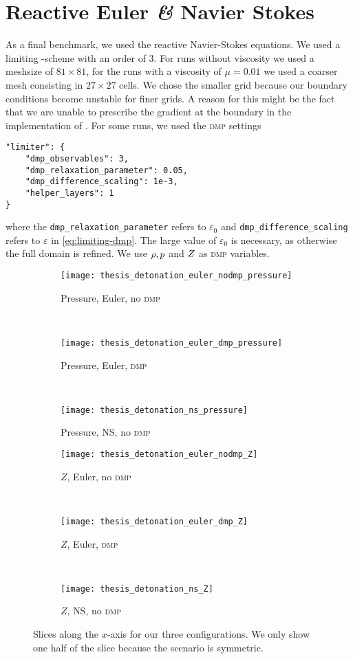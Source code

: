 \section{Reactive Euler \textit{\&} Navier Stokes}
As a final benchmark, we used the reactive Navier-Stokes equations.
We used a limiting \aderdg{}-scheme with an order of 3.
For runs without viscosity we used a meshsize of $81 \times 81$, for the runs with a viscosity of $\mu = 0.01$ we used a coarser mesh consisting in $27 \times 27$ cells.
We chose the smaller grid because our boundary conditions become unstable for finer grids.
A reason for this might be the fact that we are unable to prescribe the gradient at the boundary in the \muscl{} implementation of \exahype{}.
For some runs, we used the \textsc{dmp} settings
\begin{verbatim}
"limiter": {
    "dmp_observables": 3,
    "dmp_relaxation_parameter": 0.05,
    "dmp_difference_scaling": 1e-3,
    "helper_layers": 1
}
\end{verbatim}
where the \texttt{dmp\_relaxation\_parameter} refers to $\varepsilon_0$ and \texttt{dmp\_difference\_scaling} refers to $\varepsilon$ in \cref{eq:limiting-dmp}.
The large value of $\varepsilon_0$ is necessary, as otherwise the full domain is refined.
We use $\rho, p$ and $Z$ as \textsc{dmp} variables.
\begin{figure}[tb]
  \centering
  \begin{subfigure}[t]{0.3\textwidth}
    \centering
    \texttt{[image: thesis\_detonation\_euler\_nodmp\_pressure]}
    \caption{Pressure, Euler, no \textsc{dmp}}
  \end{subfigure}~%
  \begin{subfigure}[t]{0.3\textwidth}
    \centering
    \texttt{[image: thesis\_detonation\_euler\_dmp\_pressure]}
    \caption{Pressure, Euler, \textsc{dmp}}
  \end{subfigure}~%
  \begin{subfigure}[t]{0.3\textwidth}
    \centering
    \texttt{[image: thesis\_detonation\_ns\_pressure]}
    \caption{Pressure, \textsc{NS}, no \textsc{dmp}}
  \end{subfigure}

  \begin{subfigure}[t]{0.3\textwidth}
    \centering
    \texttt{[image: thesis\_detonation\_euler\_nodmp\_Z]}
    \caption{$Z$, Euler, no \textsc{dmp}}
  \end{subfigure}~%
  \begin{subfigure}[t]{0.3\textwidth}
    \centering
    \texttt{[image: thesis\_detonation\_euler\_dmp\_Z]}
    \caption{$Z$, Euler, \textsc{dmp}}
  \end{subfigure}~%
  \begin{subfigure}[t]{0.3\textwidth}
    \centering
    \texttt{[image: thesis\_detonation\_ns\_Z]}
    \caption{$Z$, \textsc{NS}, no \textsc{dmp}}
  \end{subfigure}
  
  \caption{\label{fig:detonation-line-plots}%
    Slices along the $x$-axis for our three configurations.
    We only show one half of the slice because the scenario is symmetric.
  }
\end{figure}
